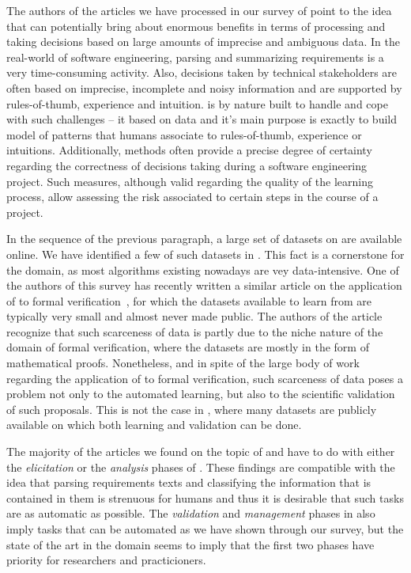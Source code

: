 	The authors of the articles we have processed in our survey of point
to the idea that \ML can potentially bring about enormous benefits in terms of
processing and taking decisions based on  large amounts of imprecise and
ambiguous data. In the real-world of software
engineering, parsing and summarizing requirements is a very time-consuming
activity. Also, decisions taken by technical stakeholders are often based on imprecise,
incomplete and noisy information and are supported by rules-of-thumb, experience
and intuition. \ML is by nature built to handle and cope with such challenges
-- it based on data and it's main purpose is exactly to build model of patterns
that humans associate to rules-of-thumb, experience or intuitions. Additionally,
\ML methods often provide a precise degree of certainty regarding the
correctness of decisions taking during a software engineering project. Such
measures, although valid regarding the quality of the learning process, allow
assessing the risk associated to certain steps in the course of a project.

In the sequence of the previous paragraph, a large set of datasets
on \RE are available online. We have identified a few of such datasets in
. This fact is a cornerstone for the domain, as most \ML
algorithms existing nowadays are vey data-intensive. One of the authors of this
survey has recently written a similar article on the application of \ML to
formal verification~\cite{AmLuBi:2018}, for which the datasets available
to learn from are typically very small and almost never made public. The authors
of the article recognize that such scarceness of data is partly due to the niche
nature of the domain of formal verification, where the datasets are mostly in
the form of mathematical proofs. Nonetheless, and in spite of the large body of
work regarding the application of \ML to formal verification, such scarceness of
data poses a problem not only to the automated learning, but also to the
scientific validation of such proposals. This is not the case in \RE, where many
datasets are publicly available on which both learning and validation can be
done.

	The majority of the articles we found on the topic of \ML and \RE have to do
with either the \emph{elicitation} or the \emph{analysis} phases of \RE. These
findings are compatible with the idea that parsing requirements texts and
classifying the information that is contained in them is strenuous for humans
and thus it is desirable that such tasks are as automatic as possible. The
\emph{validation} and \emph{management} phases in \RE also imply tasks that can
be automated as we have shown through our survey, but the state of the art in
the domain seems to imply that the first two phases have priority for
researchers and practicioners.

